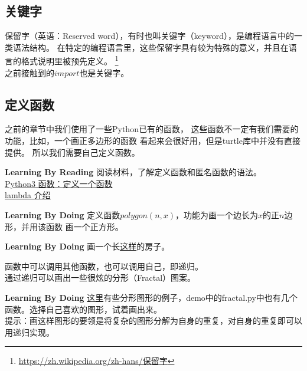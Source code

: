 \subsection{关键字}
保留字（英语：Reserved word），有时也叫关键字（keyword），是编程语言中的一类语法结构。 在特定的编程语言里，这些保留字具有较为特殊的意义，并且在语言的格式说明里被预先定义。
\footnote{\url{https://zh.wikipedia.org/zh-hans/保留字}}\\
之前接触到的$import$也是关键字。
\subsection{定义函数}
之前的章节中我们使用了一些Python已有的函数，
这些函数不一定有我们需要的功能，比如，一个画正多边形的函数
看起来会很好用，但是turtle库中并没有直接提供。
所以我们需要自己定义函数。
\begin{paperbox}{\textbf{Learning By Reading}\starfive}
阅读材料，了解定义函数和匿名函数的语法。\\
\href{http://www.runoob.com/python3/python3-function.html}{Python3 函数：定义一个函数}\\
\href{https://www.cnblogs.com/evening/archive/2012/03/29/2423554.html}{lambda 介绍}
\end{paperbox}
\begin{paperbox}{\textbf{Learning By Doing}\starfive}
定义函数$polygon(n, x)$，功能为画一个边长为$x$的正$n$边形，并用该函数
画一个正方形。
\end{paperbox}
\begin{paperbox}{\textbf{Learning By Doing}\starfour}
画一个长\href{https://imgsa.baidu.com/exp/w=480/sign=0305f63ebf8f8c54e3d3c4270a282dee/d0c8a786c9177f3ecb5dccdd7bcf3bc79e3d56f0.jpg}{这样}的房子。
\end{paperbox}
函数中可以调用其他函数，也可以调用自己，即递归。\\
通过递归可以画出一些很炫的分形（Fractal）图案。
\begin{paperbox}{\textbf{Learning By Doing}\starthree}
\href{http://www.matrix67.com/blog/archives/6231}{这里}有些分形图形的例子，demo中的fractal.py中也有几个
函数。选择自己喜欢的图形，试着画出来。\\
提示：画这样图形的要领是将复杂的图形分解为自身的重复，对自身的重复即可以用递归实现。
\end{paperbox}
